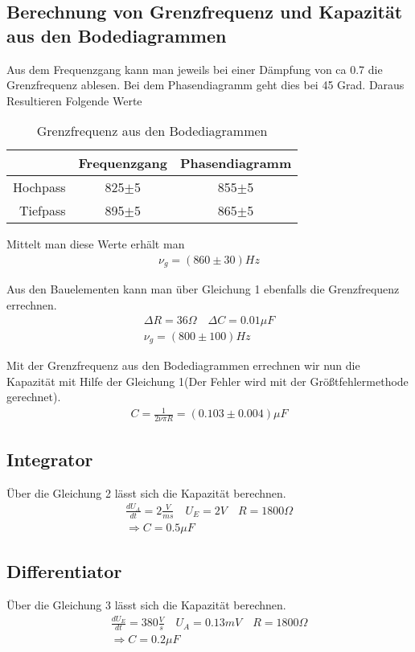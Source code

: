 \documentclass[a4paper]{article}
\begin{document}
\subsection{Berechnung von Grenzfrequenz und Kapazität aus den Bodediagrammen}

Aus dem Frequenzgang kann man jeweils bei einer Dämpfung von ca 0.7 die Grenzfrequenz ablesen.
Bei dem Phasendiagramm geht dies bei 45 Grad.
\newpage
Daraus Resultieren Folgende Werte
\begin{table}[ht]
  \centering
  \caption{Grenzfrequenz aus den Bodediagrammen}
  \begin{tabular}{|r|c|c|}
    \hline
    &Frequenzgang&Phasendiagramm \\
    \hline
    Hochpass&825$\pm$5&855$\pm$5\\
    \hline
    Tiefpass&895$\pm$5&865$\pm$5\\
    \hline
  \end{tabular}
  \label{tab:3}
\end{table}

Mittelt man diese Werte erhält man 
\begin{align}
  \nu_g = (860 \pm 30)Hz
\end{align}

Aus den Bauelementen kann man über Gleichung 1 ebenfalls die Grenzfrequenz errechnen.
\begin{align}
  \Delta R = 36 \Omega \quad \Delta C= 0.01 \mu F\\
  \nu_g = (800\pm100)Hz  
\end{align}

Mit der Grenzfrequenz aus den Bodediagrammen errechnen wir nun die Kapazität mit Hilfe der Gleichung 1(Der Fehler wird mit der Größtfehlermethode gerechnet).
\begin{align}
  C =\frac{1}{2 \nu \pi R}=(0.103 \pm 0.004)\mu F  
\end{align}

\subsection{Integrator}


Über die Gleichung 2 lässt sich die Kapazität berechnen.
\begin{align}
  \frac{dU_A}{dt} = 2 \frac{V}{ms} \quad U_E = 2 V \quad R=1800 \Omega\\ 
  \Rightarrow C = 0.5 \mu F
\end{align}

\subsection{Differentiator}
Über die Gleichung 3 lässt sich die Kapazität berechnen.
\begin{align}
  \frac{dU_E}{dt} = 380 \frac{V}{s} \quad U_A = 0.13 mV \quad R=1800 \Omega\\ 
  \Rightarrow C = 0.2 \mu F
\end{align}
\end{document}
